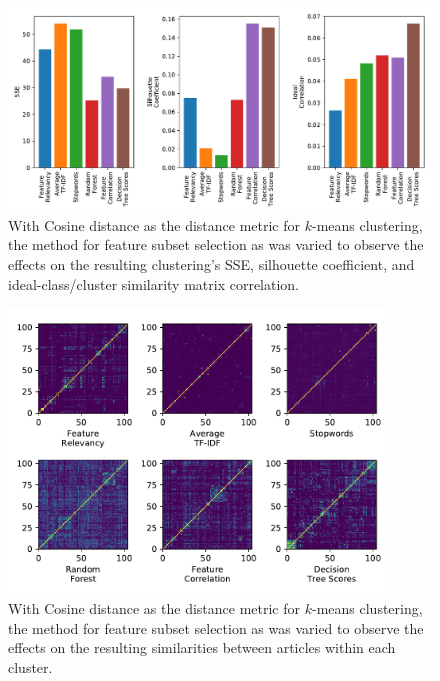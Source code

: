 \documentclass[11pt]{article}
\begin{document}

\begin{figure}[h!] \label{fig:something}
  \centering
  \includegraphics[height=0.3\textheight]{figures/hw3/cosine/feature_subset_selection}
  \caption{With Cosine distance as the distance metric for $k$-means clustering, the method for feature subset selection as was varied to observe the effects on the resulting clustering's SSE, silhouette coefficient, and ideal-class/cluster similarity matrix correlation.}
\end{figure}

\begin{figure}[h!] \label{fig:something}
  \centering
  \includegraphics[width=0.9\textwidth]{figures/hw3/cosine/similarity_matrices}
  \caption{With Cosine distance as the distance metric for $k$-means clustering, the method for feature subset selection as was varied to observe the effects on the resulting similarities between articles within each cluster.}
\end{figure}
\end{document}
